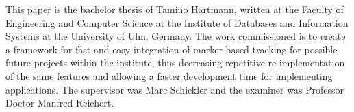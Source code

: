 This paper is the bachelor thesis of Tamino Hartmann, written at the Faculty of Engineering and Computer Science\cite{faculty} at the Institute of Databases and Information Systems at the University of Ulm\cite{ulmuni}, Germany.
The work commissioned is to create a framework for fast and easy integration of marker-based tracking for possible future projects within the institute, thus decreasing repetitive re-implementation of the same features and allowing a faster development time for implementing applications.
The supervisor was Marc Schickler and the examiner was Professor Doctor Manfred Reichert.
